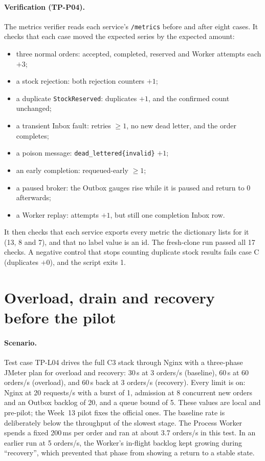 \documentclass[a4paper]{report}
\begin{document}
\paragraph{Verification (TP-P04).} The metrics verifier reads
each service's \texttt{/metrics} before and after eight cases. It checks that
each case moved the expected series by the expected amount:
\begin{itemize}
  \item three normal orders: accepted, completed, reserved and Worker
    attempts each $+3$;
  \item a stock rejection: both rejection counters $+1$;
  \item a duplicate \texttt{StockReserved}: duplicates $+1$, and the
    confirmed count unchanged;
  \item a transient Inbox fault: retries $\ge 1$, no new dead letter, and the
    order completes;
  \item a poison message: \texttt{dead\_lettered\{invalid\}} $+1$;
  \item an early completion: requeued-early $\ge 1$;
  \item a paused broker: the Outbox gauges rise while it is paused and return
    to 0 afterwards;
  \item a Worker replay: attempts $+1$, but still one completion Inbox row.
\end{itemize}
It then checks that each service exports every metric the dictionary lists
for it (13, 8 and 7), and that no label value is an id. The fresh-clone run
passed all 17 checks. A negative control that stops counting
duplicate stock results fails case C (duplicates $+0$), and the script
exits 1.

\section{Overload, drain and recovery before the pilot}\label{app:ver-overload}

\paragraph{Scenario.} Test case TP-L04 drives the full C3 stack through Nginx
with a three-phase JMeter plan for overload and recovery: 30\,s at 3 orders/s
(baseline), 60\,s at 60 orders/s (overload), and 60\,s back at 3 orders/s
(recovery). Every limit is on: Nginx at 20 requests/s with a burst of 1,
admission at 8 concurrent new orders and an Outbox backlog of 20, and a
queue bound of 5. These values are local and pre-pilot; the Week~13 pilot
fixes the official ones. The baseline rate is deliberately below the
throughput of the slowest stage. The Process Worker spends a fixed 200\,ms per
order and ran at about 3.7 orders/s in this test. In an earlier run at 5
orders/s, the Worker's in-flight backlog kept growing during ``recovery'',
which prevented that phase from showing a return to a stable state.
\end{document}
